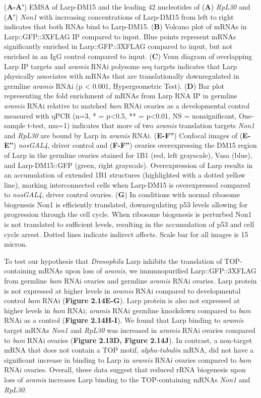 \documentclass[12pt,oneside]{reedthesis}
\begin{document}
\setlength\parindent{0pt}(\textbf{A-A'}) EMSA of Larp-DM15 and the leading 42 nucleotides of (\textbf{A}) \emph{RpL30} and (\textbf{A'}) \emph{Non1} with increasing concentrations of Larp-DM15 from left to right indicates that both RNAs bind to Larp-DM15. (\textbf{B}) Volcano plot of mRNAs in Larp::GFP::3XFLAG IP compared to input. Blue points represent mRNAs significantly enriched in Larp::GFP::3XFLAG compared to input, but not enriched in an IgG control compared to input. (\textbf{C}) Venn diagram of overlapping Larp IP targets and \emph{aramis} RNAi polysome seq targets indicates that Larp physically associates with mRNAs that are translationally downregulated in germline \emph{aramis} RNAi (p \textless{} 0.001, Hypergeometric Test). (\textbf{D}) Bar plot representing the fold enrichment of mRNAs from Larp RNA IP in germline \emph{aramis} RNAi relative to matched \emph{bam} RNAi ovaries as a developmental control measured with qPCR (n=3, * = p\textless0.5, ** = p\textless0.01, NS = nonsignificant, One-sample t-test, mu=1) indicates that more of two \emph{aramis} translation targets \emph{Non1} and \emph{RpL30} are bound by Larp in \emph{aramis} RNAi. (\textbf{E-F''}) Confocal images of (\textbf{E-E''}) \emph{nosGAL4}, driver control and (\textbf{F-F''}) ovaries overexpressing the DM15 region of Larp in the germline ovaries stained for 1B1 (red, left grayscale), Vasa (blue), and Larp-DM15::GFP (green, right grayscale). Overexpression of Larp results in an accumulation of extended 1B1 structures (highlighted with a dotted yellow line), marking interconnected cells when Larp-DM15 is overexpressed compared to \emph{nosGAL4}, driver control ovaries. (\textbf{G}) In conditions with normal ribosome biogenesis Non1 is efficiently translated, downregulating p53 levels allowing for progression through the cell cycle. When ribosome biogenesis is perturbed Non1 is not translated to sufficient levels, resulting in the accumulation of p53 and cell cycle arrest. Dotted lines indicate indirect affects. Scale bar for all images is 15 micron.

\textbf{\hfill\break
}

To test our hypothesis that \emph{Drosophila} Larp inhibits the translation of TOP-containing mRNAs upon loss of \emph{aramis}, we immunopurified Larp::GFP::3XFLAG from germline \emph{bam} RNAi ovaries and germline \emph{aramis} RNAi ovaries. Larp protein is not expressed at higher levels in \emph{aramis} RNAi compared to developmental control \emph{bam} RNAi (\textbf{Figure 2.14E-G}). Larp protein is also not expressed at higher levels in \emph{bam} RNAi; \emph{aramis} RNAi germline knockdown compared to \emph{bam} RNAi as a control (\textbf{Figure 2.14H-I}). We found that Larp binding to \emph{aramis} target mRNAs \emph{Non1} and \emph{RpL30} was increased in \emph{aramis} RNAi ovaries compared to \emph{bam} RNAi ovaries (\textbf{Figure 2.13D, Figure 2.14J}). In contrast, a non-target mRNA that does not contain a TOP motif, \emph{alpha-tubulin} mRNA, did not have a significant increase in binding to Larp in \emph{aramis} RNAi ovaries compared to \emph{bam} RNAi ovaries. Overall, these data suggest that reduced rRNA biogenesis upon loss of \emph{aramis} increases Larp binding to the TOP-containing mRNAs \emph{Non1} and \emph{RpL30}.
\end{document}
